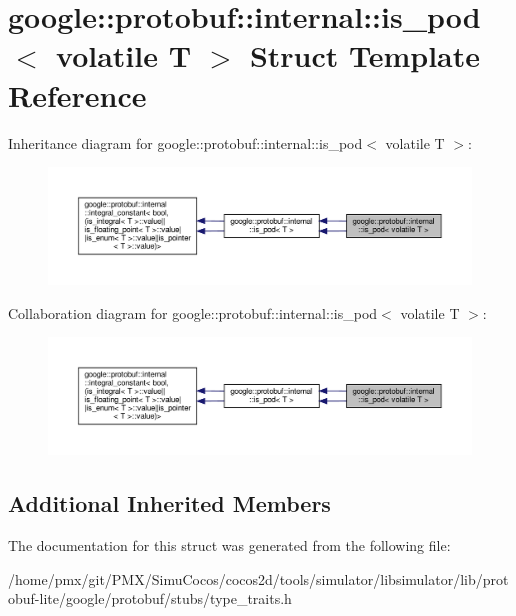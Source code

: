 \hypertarget{structgoogle_1_1protobuf_1_1internal_1_1is__pod_3_01volatile_01T_01_4}{}\section{google\+:\+:protobuf\+:\+:internal\+:\+:is\+\_\+pod$<$ volatile T $>$ Struct Template Reference}
\label{structgoogle_1_1protobuf_1_1internal_1_1is__pod_3_01volatile_01T_01_4}


Inheritance diagram for google\+:\+:protobuf\+:\+:internal\+:\+:is\+\_\+pod$<$ volatile T $>$\+:
\nopagebreak
\begin{figure}[H]
\begin{center}
\leavevmode
\includegraphics[width=350pt]{structgoogle_1_1protobuf_1_1internal_1_1is__pod_3_01volatile_01T_01_4__inherit__graph}
\end{center}
\end{figure}


Collaboration diagram for google\+:\+:protobuf\+:\+:internal\+:\+:is\+\_\+pod$<$ volatile T $>$\+:
\nopagebreak
\begin{figure}[H]
\begin{center}
\leavevmode
\includegraphics[width=350pt]{structgoogle_1_1protobuf_1_1internal_1_1is__pod_3_01volatile_01T_01_4__coll__graph}
\end{center}
\end{figure}
\subsection*{Additional Inherited Members}


The documentation for this struct was generated from the following file\+:\begin{DoxyCompactItemize}
\item 
/home/pmx/git/\+P\+M\+X/\+Simu\+Cocos/cocos2d/tools/simulator/libsimulator/lib/protobuf-\/lite/google/protobuf/stubs/type\+\_\+traits.\+h\end{DoxyCompactItemize}
